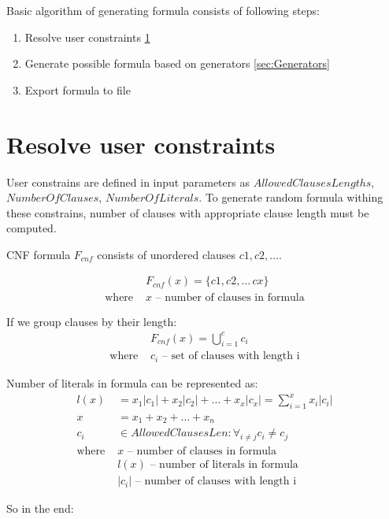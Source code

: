 Basic algorithm of generating formula consists of following steps:

\begin{enumerate}
  \item Resolve user constraints \ref{sec:ResolveUserConstrains}
  \item Generate possible formula based on generators \ref{sec:Generators}
  \item Export formula to file
\end{enumerate}


\section{Resolve user constraints}
\label{sec:ResolveUserConstrains}

User constrains are defined in input parameters as $AllowedClausesLengths$, $NumberOfClauses$, $NumberOfLiterals$. To generate random formula withing these constrains, number of clauses with appropriate clause length must be computed.

CNF formula $F_{cnf}$ consists of unordered clauses $c1, c2, \dots$. 

\begin{align*}
	&F_{cnf}(x) = \{c1, c2, \dots\, cx\} \\
	\text{where }
		&x \text{ -- number of clauses in formula}
\end{align*}

If we group clauses by their length:
\begin{align*}
	&F_{cnf}(x) = \bigcup_{i=1}^c c_i \\
	\text{where }
		&c_i \text{ -- set of clauses with length i} 
\end{align*}

Number of literals in formula can be represented as:
\begin{align*}
	l(x) &= x_1|c_1| + x_2|c_2| + \dots + x_x|c_x| = \sum_{i=1}^{x} x_i |c_i| \\
	x &= x_1 + x_2 + \dots + x_n \\
	c_i &\in AllowedClausesLen: \forall_{i \neq j} c_i \neq c_j  \\
	\text{where }
		&x \text{ -- number of clauses in formula} \\ 
		&l(x) \text{ -- number of literals in formula} \\ 
		&|c_i| \text{ -- number of clauses with length i} 
\end{align*}

So in the end:

